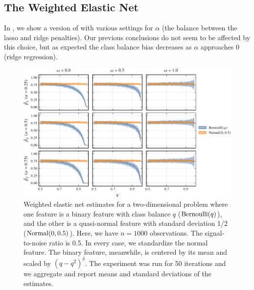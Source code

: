 \subsection{The Weighted Elastic Net}%
\label{sec:additional-experiments-weighted-elnet}

In , we show a version of  with
various settings for \(\alpha\) (the balance between the lasso and ridge penalties). Our
previous conclusions do not seem to be affected by this choice, but as expected the class
balance bias decreases as \(\alpha\) approaches 0 (ridge regression).

\begin{figure}[htpb]
  \centering
  \includegraphics{plots/mixed_data_elnet.pdf}
  \caption{%
    Weighted elastic net estimates for a two-dimensional problem where one feature is a binary
    feature with class balance \(q\) (\(\operatorname{Bernoulli}(q)\)), and the other is a quasi-normal
    feature with standard deviation 1/2 (\(\operatorname{Normal}(0, 0.5)\)). Here, we have \(n = \num{1000}\)
    observations. The signal-to-noise ratio is 0.5. In every case, we standardize the normal
    feature. The binary feature, meanwhile, is centered by its mean and scaled by
    \((q-q^2)^\delta\). The experiment was run for 50 iterations and we aggregate and report
    means and standard deviations of the estimates.
  }
  \label{fig:mixed-data-elnet-full}
\end{figure}
